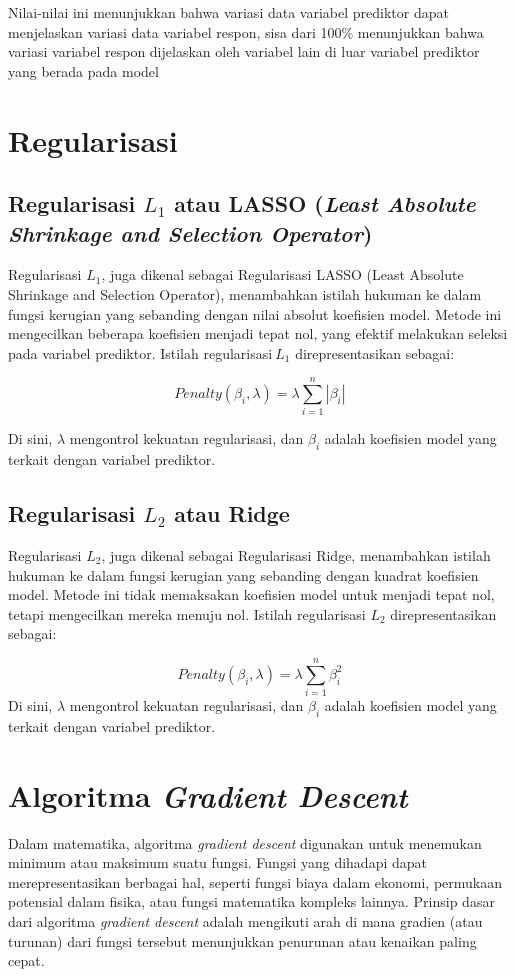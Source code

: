 Nilai-nilai ini menunjukkan bahwa variasi data variabel prediktor dapat
menjelaskan variasi data variabel respon, sisa dari 100\% menunjukkan
bahwa variasi variabel respon dijelaskan oleh variabel lain di luar
variabel prediktor yang berada pada model
%
\section{Regularisasi}
\subsection{Regularisasi $L_1$ atau LASSO (\emph{Least Absolute Shrinkage and Selection Operator})}
Regularisasi \(L_{1}\), juga dikenal sebagai Regularisasi LASSO (Least
Absolute Shrinkage and Selection Operator), menambahkan istilah hukuman
ke dalam fungsi kerugian yang sebanding dengan nilai absolut koefisien
model. Metode ini mengecilkan beberapa koefisien menjadi tepat nol, yang
efektif melakukan seleksi pada variabel prediktor. Istilah
regularisasi\(\ L_{1}\) direpresentasikan sebagai:

\begin{equation}\label{penaltyL1}
    Penalty\left( \beta_{i}, \lambda \right) = \lambda\sum_{i = 1}^{n}\left| \beta_{i} \right|
\end{equation}

Di sini, \(\lambda\) mengontrol kekuatan regularisasi, dan \(\beta_{i}\)
adalah koefisien model yang terkait dengan variabel prediktor\citep*{Hastie2009}.

%
\subsection{Regularisasi $L_2$ atau Ridge}
Regularisasi \(L_{2}\), juga dikenal sebagai Regularisasi Ridge,
menambahkan istilah hukuman ke dalam fungsi kerugian yang sebanding
dengan kuadrat koefisien model. Metode ini tidak memaksakan koefisien
model untuk menjadi tepat nol, tetapi mengecilkan mereka menuju nol.
Istilah regularisasi \(L_{2}\) direpresentasikan sebagai:

\begin{equation}\label{penaltyL2}
    Penalty\left( \beta_{i},\lambda \right) = \lambda\sum_{i = 1}^{n}\beta_{i}^{2}
\end{equation}
Di sini, $\lambda$ mengontrol kekuatan regularisasi, dan \(\beta_{i}\) adalah
koefisien model yang terkait dengan variabel prediktor\citep*{Bishop2006}.

\section{Algoritma \emph{Gradient Descent}}
Dalam matematika, algoritma \emph{gradient descent} digunakan untuk
menemukan minimum atau maksimum suatu fungsi. Fungsi yang dihadapi dapat
merepresentasikan berbagai hal, seperti fungsi biaya dalam ekonomi,
permukaan potensial dalam fisika, atau fungsi matematika kompleks
lainnya. Prinsip dasar dari algoritma \emph{gradient descent} adalah
mengikuti arah di mana gradien (atau turunan) dari fungsi tersebut
menunjukkan penurunan atau kenaikan paling cepat.

